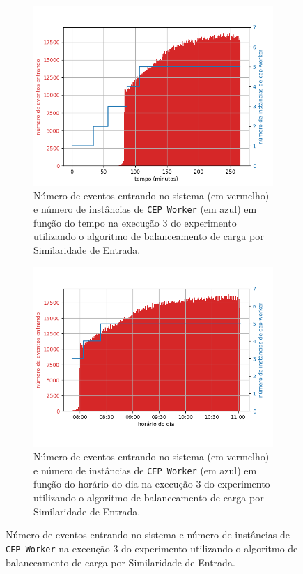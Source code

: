 \begin{figure}[h]
\centering
\begin{subfigure}{0.9\textwidth}
\centering
\includegraphics[width=\textwidth]{figuras/graphics/carga_e_workers_total8-dez-is.png}
\caption{Número de eventos entrando no sistema (em vermelho) e número de instâncias de \texttt{CEP Worker} (em azul) em função do tempo na execução 3 do experimento utilizando o algoritmo de balanceamento de carga por Similaridade de Entrada.}
\label{fig:workers_and_load_total-8-dez-is}
\end{subfigure}%

\begin{subfigure}{\textwidth}
\centering
\includegraphics[width=\textwidth]{figuras/graphics/carga_e_workers_horario8-dez-is.png}
\caption{Número de eventos entrando no sistema (em vermelho) e número de instâncias de \texttt{CEP Worker} (em azul) em função do horário do dia na execução 3 do experimento utilizando o algoritmo de balanceamento de carga por Similaridade de Entrada.}
\label{fig:workers_and_load_SPtrans-8-dez-is}
\end{subfigure}%
\caption{Número de eventos entrando no sistema e número de instâncias de \texttt{CEP Worker} na execução 3 do experimento utilizando o algoritmo de balanceamento de carga por Similaridade de Entrada.}
\end{figure}




